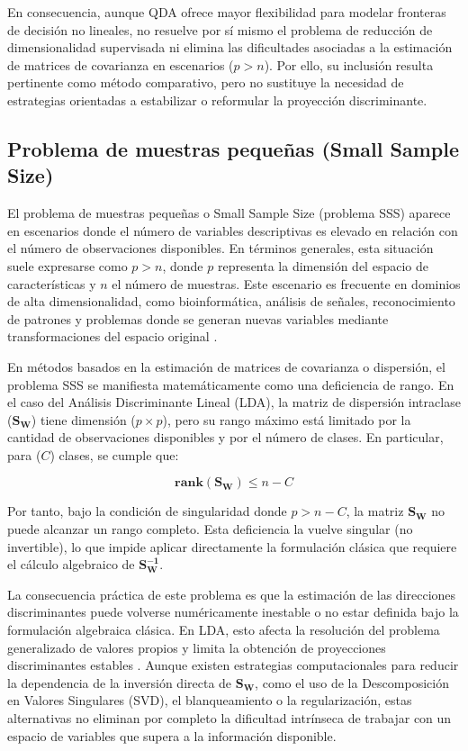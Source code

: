 En consecuencia, aunque QDA ofrece mayor flexibilidad para modelar fronteras de decisión no lineales, no resuelve por sí mismo el problema de reducción de dimensionalidad supervisada ni elimina las dificultades asociadas a la estimación de matrices de covarianza en escenarios ($p>n$). Por ello, su inclusión resulta pertinente como método comparativo, pero no sustituye la necesidad de estrategias orientadas a estabilizar o reformular la proyección discriminante.

\subsection{Problema de muestras pequeñas (Small Sample Size)}

El problema de muestras pequeñas o Small Sample Size (problema SSS) aparece en escenarios donde el número de variables descriptivas es elevado en relación con el número de observaciones disponibles. En términos generales, esta situación suele expresarse como $p>n$, donde $p$ representa la dimensión del espacio de características y $n$ el número de muestras. Este escenario es frecuente en dominios de alta dimensionalidad, como bioinformática, análisis de señales, reconocimiento de patrones y problemas donde se generan nuevas variables mediante transformaciones del espacio original \cite{raudys1991small}\cite{sorzano2014survey}.

En métodos basados en la estimación de matrices de covarianza o dispersión, el problema SSS se manifiesta matemáticamente como una deficiencia de rango. En el caso del Análisis Discriminante Lineal (LDA), la matriz de dispersión intraclase ($\mathbf{S_W}$) tiene dimensión ($p\times p$), pero su rango máximo está limitado por la cantidad de observaciones disponibles y por el número de clases. En particular, para ($C$) clases, se cumple que:

\begin{equation}
	\mathbf{rank(S_W)}\leq n-C
	\label{eq:EMT11}
\end{equation}

Por tanto, bajo la condición de singularidad donde $p>n-C$, la matriz $\mathbf{S_W}$ no puede alcanzar un rango completo. Esta deficiencia la vuelve singular (no invertible), lo que impide aplicar directamente la formulación clásica que requiere el cálculo algebraico de $\mathbf{S_W^{-1}}$.

La consecuencia práctica de este problema es que la estimación de las direcciones discriminantes puede volverse numéricamente inestable o no estar definida bajo la formulación algebraica clásica. En LDA, esto afecta la resolución del problema generalizado de valores propios y limita la obtención de proyecciones discriminantes estables \cite{gao2006direct} \cite{martinez2001pca}. Aunque existen estrategias computacionales para reducir la dependencia de la inversión directa de $\mathbf{S_W}$, como el uso de la Descomposición en Valores Singulares (SVD), el blanqueamiento o la regularización, estas alternativas no eliminan por completo la dificultad intrínseca de trabajar con un espacio de variables que supera a la información disponible.


